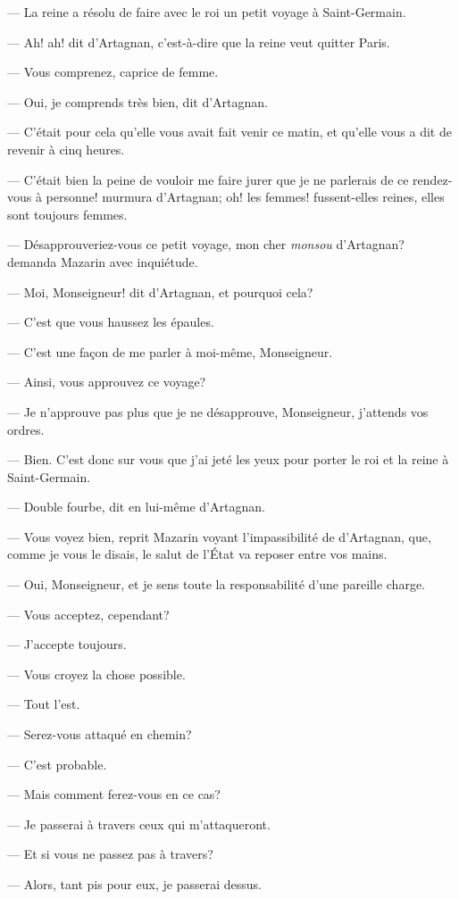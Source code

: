— La reine a résolu de faire avec le roi un petit voyage à Saint-Germain.

— Ah! ah! dit d'Artagnan, c'est-à-dire que la reine veut quitter Paris.

— Vous comprenez, caprice de femme.

— Oui, je comprends très bien, dit d'Artagnan.

— C'était pour cela qu'elle vous avait fait venir ce matin, et qu'elle vous a dit de revenir à cinq heures.

— C'était bien la peine de vouloir me faire jurer que je ne parlerais de ce rendez-vous à personne! murmura d'Artagnan; oh! les femmes! fussent-elles reines, elles sont toujours femmes.

— Désapprouveriez-vous ce petit voyage, mon cher \textit{monsou} d'Artagnan? demanda Mazarin avec inquiétude.

— Moi, Monseigneur! dit d'Artagnan, et pourquoi cela?

— C'est que vous haussez les épaules.

— C'est une façon de me parler à moi-même, Monseigneur.

— Ainsi, vous approuvez ce voyage?

— Je n'approuve pas plus que je ne désapprouve, Monseigneur, j'attends vos ordres.

— Bien. C'est donc sur vous que j'ai jeté les yeux pour porter le roi et la reine à Saint-Germain.

— Double fourbe, dit en lui-même d'Artagnan.

— Vous voyez bien, reprit Mazarin voyant l'impassibilité de d'Artagnan, que, comme je vous le disais, le salut de l'État va reposer entre vos mains.

— Oui, Monseigneur, et je sens toute la responsabilité d'une pareille charge.

— Vous acceptez, cependant?

— J'accepte toujours.

— Vous croyez la chose possible.

— Tout l'est.

— Serez-vous attaqué en chemin?

— C'est probable.

— Mais comment ferez-vous en ce cas?

— Je passerai à travers ceux qui m'attaqueront.

— Et si vous ne passez pas à travers?

— Alors, tant pis pour eux, je passerai dessus.

